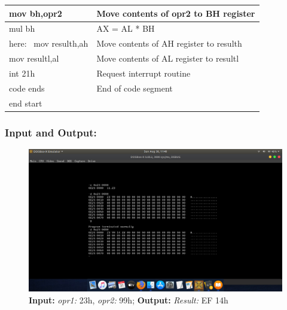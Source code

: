 \documentclass[12pt,a4paper]{article}
\begin{document}
\begin{flushleft}
\begin{table}[htb]
{\begin{tabular}{|l|l|}
\hline
mov bh,opr2                                                      & Move contents of opr2 to BH register          \\ 
\hline
mul bh                                                           & AX = AL * BH                                  \\ 
\hline
here:~ mov resulth,ah                                            & Move contents of AH register to resulth       \\ 
\hline
mov resultl,al                                                   & Move contents of AL register to resultl       \\ 
\hline
int 21h                                                          & Request interrupt routine                     \\ 
\hline
code ends                                                        & End of code segment                           \\
\hline
end start                                                        &                                               \\
\hline
\end{tabular}
}
\end{table}

\newpage
\subsubsection*{\textbf{Input and Output:}}
\begin{figure}[h]
    \centering
    \includegraphics[trim = 100mm 70mm 100mm 80mm, clip, width = \textwidth]{Pics/Multiplication.png}
    \caption{ \textbf{Input:} \emph{opr1:} 23h, \emph{opr2:} 99h; 
              \textbf{Output:} \emph{Result:} EF 14h}
\end{figure}



\end{flushleft}
\end{document}
